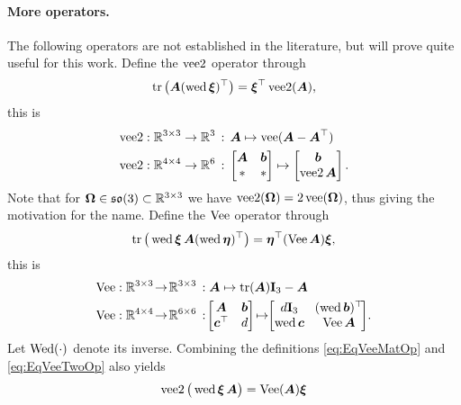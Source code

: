 \paragraph{More operators.}
The following operators are not established in the literature, but will prove quite useful for this work.
Define the $\operatorname{vee2}$ operator through
\begin{align}\label{eq:EqVeeTwoOp}
 \operatorname{tr}\big( \boldsymbol{A} (\operatorname{wed}\boldsymbol{\xi})^\top \big) = \boldsymbol{\xi}^\top \operatorname{vee2}(\boldsymbol{A}),
\end{align}
this is
\begin{subequations}
\begin{align}
 \operatorname{vee2} &: \mathbb{R}^{3\times 3} \rightarrow \mathbb{R}^3 \, : \, \boldsymbol{A} \mapsto \operatorname{vee}(\boldsymbol{A}-\boldsymbol{A}^\top)
\\
 \operatorname{vee2} &: \mathbb{R}^{4\times 4} \rightarrow \mathbb{R}^6 \, : \, \begin{bmatrix} \boldsymbol{A} & \boldsymbol{b} \\ \ast & \ast \end{bmatrix} \mapsto \begin{bmatrix} \boldsymbol{b} \\ \operatorname{vee2}\boldsymbol{A} \end{bmatrix}.
\end{align}
\end{subequations}
Note that for $\boldsymbol{\Omega} \in \mathfrak{so}(3) \subset \mathbb{R}^{3\times3}$ we have $\operatorname{vee2}(\boldsymbol{\Omega}) = 2 \operatorname{vee}(\boldsymbol{\Omega})$, thus giving the motivation for the name.
Define the $\operatorname{Vee}$ operator through
\begin{align}\label{eq:EqVeeMatOp}
 \operatorname{tr}\big( \operatorname{wed}\boldsymbol{\xi}\, \boldsymbol{A} (\operatorname{wed}\boldsymbol{\eta})^\top \big) = \boldsymbol{\eta}^\top (\operatorname{Vee}\boldsymbol{A}) \boldsymbol{\xi},
\end{align}
this is
\begin{subequations}
\begin{align}
 \veeMatOp &: \RealNum^{3\times 3} \!\rightarrow\! \RealNum^{3\times 3} \, : \mat{A} \mapsto \tr(\mat{A}) \idMat[3] - \mat{A}
\\
 \veeMatOp &: \RealNum^{4\times 4} \!\rightarrow\! \RealNum^{6\times 6} \, : \!\begin{bmatrix} \mat{A} & \tuple{b} \\ \tuple{c}^\top & d \end{bmatrix} \!\mapsto\!\! \begin{bmatrix} d \idMat[3] & \!(\wedOp \tuple{b})^\top\! \\ \wedOp\tuple{c} & \veeMatOp\mat{A} \end{bmatrix}\!.
\end{align} 
\end{subequations}
Let $\operatorname{Wed}(\cdot)$ denote its inverse.
Combining the definitions \eqref{eq:EqVeeMatOp} and \eqref{eq:EqVeeTwoOp} also yields
\begin{align}
 \operatorname{vee2}\big(\operatorname{wed}\boldsymbol{\xi} \, \boldsymbol{A} \big) = \operatorname{Vee}(\boldsymbol{A}) \boldsymbol{\xi}
\end{align}

